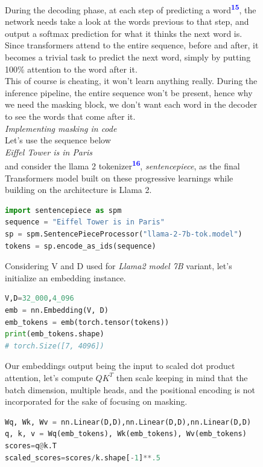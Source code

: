 \documentclass[12pt]{article}
\newcommand{\customtext}[3]{%
    \vspace{#2} %
    \fontsize{13}{8}\textcolor{#1}{\textit{#3}}%
}
\newcommand{\sidecite}[1]{\textsuperscript{\textcolor{blue}{\textbf{\scriptsize#1}}}}
\begin{document}
\begin{figure}[!htb]
    \begin{minipage}[t]{0.65\textwidth}
    \raggedright
    During the decoding phase, at each step of predicting a word\sidecite{15}, the network needs take a look 
    at the words previous to that step, and output a softmax prediction for what it thinks the next word 
    is. Since transformers attend to the entire sequence, before and after, it becomes a trivial task to predict 
    the next word, simply by putting 100\% attention to the word after it.\\
    This of course is cheating, it won't learn anything really. During the inference pipeline, the entire sequence 
    won't be present, hence why we need the masking block, we don't want each word in the decoder to see the words 
    that come after it.\\
    \customtext{xtitle}{1em}{Implementing masking in code}\\
    Let's use the sequence below\\
    {\it Eiffel Tower is in Paris}\\
    and consider the llama 2 tokenizer\sidecite{16}, {\it sentencepiece}, as the final Transformers model built on these progressive learnings  
    while building on the architecture is Llama 2.
\begin{lstlisting}[language=python,style=python,basicstyle=\ttfamily\footnotesize]
import sentencepiece as spm 
sequence = "Eiffel Tower is in Paris"
sp = spm.SentencePieceProcessor("llama-2-7b-tok.model")
tokens = sp.encode_as_ids(sequence)
\end{lstlisting}
Considering V and D used for {\it Llama2 model 7B} variant, let's initialize an embedding instance. 
\begin{lstlisting}[language=python,style=python,basicstyle=\ttfamily\footnotesize]
V,D=32_000,4_096
emb = nn.Embedding(V, D)
emb_tokens = emb(torch.tensor(tokens))
print(emb_tokens.shape)
# torch.Size([7, 4096])
\end{lstlisting}
Our embeddings output being the input to scaled dot product attention, let's compute $QK^T$ then scale
keeping in mind that the batch dimension, multiple heads, and the positional encoding is not incorporated 
for the sake of focusing on masking.
\begin{lstlisting}[language=python,style=python,basicstyle=\ttfamily\footnotesize]
Wq, Wk, Wv = nn.Linear(D,D),nn.Linear(D,D),nn.Linear(D,D)
q, k, v = Wq(emb_tokens), Wk(emb_tokens), Wv(emb_tokens)
scores=q@k.T
scaled_scores=scores/k.shape[-1]**.5

\end{lstlisting}
\end{minipage}
\end{figure}
\end{document}
